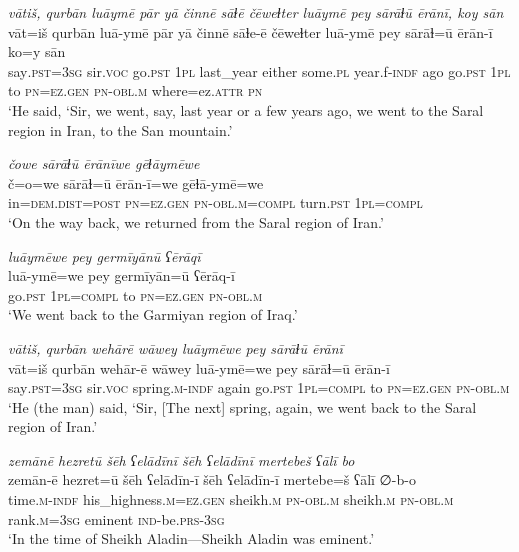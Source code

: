 \ea \label{ZQ.9}
\textit{vātiš, qurbān luāymē pār yā činnē sāɫē čēweɫter luāymē pey sārāɫū ērānī, koy sān} \\ 
\gll vāt=iš qurbān luā-ymē pār yā činnē sāɫe-ē čēweɫter luā-ymē pey sārāɫ=ū ērān-ī ko=y sān \\ 
 say\textsc{.pst}\textsc{=3sg} sir.\textsc{voc} go\textsc{.pst} \textsc{1pl} last\_year either some\textsc{.pl} year.f\textsc{-indf} ago go\textsc{.pst} \textsc{1pl} to \textsc{pn}\textsc{=ez.gen} \textsc{pn}\textsc{-obl}\textsc{.m} where=ez.\textsc{attr} \textsc{pn} \\ 
\glt `He said, ‘Sir, we went, say, last year or a few years ago, we went to the Saral region in Iran, to the San mountain.'
\z 
 
\ea \label{ZQ.10}
\textit{čowe sārāɫū ērānīwe gēɫāymēwe} \\ 
\gll č=o=we sārāɫ=ū ērān-ī=we gēɫā-ymē=we \\ 
 in=\textsc{dem.dist}\textsc{=\textsc{post}} \textsc{pn}\textsc{=ez.gen} \textsc{pn}\textsc{-obl}\textsc{.m}\textsc{=compl} turn\textsc{.pst} \textsc{1pl}\textsc{=compl} \\ 
\glt `On the way back, we returned from the Saral region of Iran.'
\z 
 
\ea \label{ZQ.27}
\textit{luāymēwe pey germīyānū ʕērāqī} \\ 
\gll luā-ymē=we pey germīyān=ū ʕērāq-ī \\ 
 go\textsc{.pst} \textsc{1pl}\textsc{=compl} to \textsc{pn}\textsc{=ez.gen} \textsc{pn}\textsc{-obl}\textsc{.m} \\ 
\glt `We went back to the Garmiyan region of Iraq.'
\z 
 
\ea \label{ZQ.33}
\textit{vātiš, qurbān wehārē wāwey luāymēwe pey sārāɫū ērānī} \\ 
\gll vāt=iš qurbān wehār-ē wāwey luā-ymē=we pey sārāɫ=ū ērān-ī \\ 
 say\textsc{.pst}\textsc{=3sg} sir.\textsc{voc} spring\textsc{.m}\textsc{-indf} again go\textsc{.pst} \textsc{1pl}\textsc{=compl} to \textsc{pn}\textsc{=ez.gen} \textsc{pn}\textsc{-obl}\textsc{.m} \\ 
\glt `He (the man) said, ‘Sir, [The next] spring, again, we went back to the Saral region of Iran.'
\z 
 
\ea \label{HB.1}
\textit{zemānē hezretū šēh ʕelādīnī šēh ʕelādīnī mertebeš ʕālī bo} \\ 
\gll zemān-ē hezret=ū šēh ʕelādīn-ī šēh ʕelādīn-ī mertebe=š ʕālī ∅-b-o \\ 
 time\textsc{.m}\textsc{-indf} his\_highness\textsc{.m}\textsc{=ez}\textsc{.gen} sheikh\textsc{.m} \textsc{pn}\textsc{-obl}\textsc{.m} sheikh\textsc{.m} \textsc{pn}\textsc{-obl}\textsc{.m} rank\textsc{.m}\textsc{=3sg} eminent \textsc{ind-}be\textsc{.prs}\textsc{-3sg} \\ 
\glt `In the time of Sheikh Aladin—Sheikh Aladin was eminent.'
\z 
 
